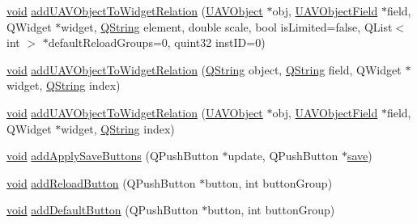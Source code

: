 \begin{DoxyCompactItemize}
\item 
\hyperlink{group___u_a_v_objects_plugin_ga444cf2ff3f0ecbe028adce838d373f5c}{void} \hyperlink{group___u_a_v_object_widget_utils_ga70ea9dedfc9c692d10fd0c2223336ff6}{add\-U\-A\-V\-Object\-To\-Widget\-Relation} (\hyperlink{class_u_a_v_object}{\-U\-A\-V\-Object} $\ast$obj, \hyperlink{class_u_a_v_object_field}{\-U\-A\-V\-Object\-Field} $\ast$field, \-Q\-Widget $\ast$widget, \hyperlink{group___u_a_v_objects_plugin_gab9d252f49c333c94a72f97ce3105a32d}{\-Q\-String} element, double scale, bool is\-Limited=false, \-Q\-List$<$ int $>$ $\ast$default\-Reload\-Groups=0, quint32 inst\-I\-D=0)
\item 
\hyperlink{group___u_a_v_objects_plugin_ga444cf2ff3f0ecbe028adce838d373f5c}{void} \hyperlink{group___u_a_v_object_widget_utils_gae3ae5288613fb8062c029d9a4da6c759}{add\-U\-A\-V\-Object\-To\-Widget\-Relation} (\hyperlink{group___u_a_v_objects_plugin_gab9d252f49c333c94a72f97ce3105a32d}{\-Q\-String} object, \hyperlink{group___u_a_v_objects_plugin_gab9d252f49c333c94a72f97ce3105a32d}{\-Q\-String} field, \-Q\-Widget $\ast$widget, \hyperlink{group___u_a_v_objects_plugin_gab9d252f49c333c94a72f97ce3105a32d}{\-Q\-String} index)
\item 
\hyperlink{group___u_a_v_objects_plugin_ga444cf2ff3f0ecbe028adce838d373f5c}{void} \hyperlink{group___u_a_v_object_widget_utils_ga368867adfb58200a5f6af90141e8f1ae}{add\-U\-A\-V\-Object\-To\-Widget\-Relation} (\hyperlink{class_u_a_v_object}{\-U\-A\-V\-Object} $\ast$obj, \hyperlink{class_u_a_v_object_field}{\-U\-A\-V\-Object\-Field} $\ast$field, \-Q\-Widget $\ast$widget, \hyperlink{group___u_a_v_objects_plugin_gab9d252f49c333c94a72f97ce3105a32d}{\-Q\-String} index)
\item 
\hyperlink{group___u_a_v_objects_plugin_ga444cf2ff3f0ecbe028adce838d373f5c}{void} \hyperlink{group___u_a_v_object_widget_utils_ga38c270f9a29f4e190e71414bdce82590}{add\-Apply\-Save\-Buttons} (\-Q\-Push\-Button $\ast$update, \-Q\-Push\-Button $\ast$\hyperlink{group___u_a_v_object_widget_utils_gabae71bcf9c71f99595c365fd49b342fc}{save})
\item 
\hyperlink{group___u_a_v_objects_plugin_ga444cf2ff3f0ecbe028adce838d373f5c}{void} \hyperlink{group___u_a_v_object_widget_utils_ga08a7e3f2686fdb1ef91db0843cb9414e}{add\-Reload\-Button} (\-Q\-Push\-Button $\ast$button, int button\-Group)
\item 
\hyperlink{group___u_a_v_objects_plugin_ga444cf2ff3f0ecbe028adce838d373f5c}{void} \hyperlink{group___u_a_v_object_widget_utils_gac0e04866c45a89a3f2c6f3241afa86d3}{add\-Default\-Button} (\-Q\-Push\-Button $\ast$button, int button\-Group)

\end{DoxyCompactItemize}
